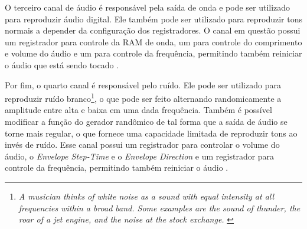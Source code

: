     O terceiro canal de áudio é responsável pela saída de onda e pode ser utilizado para reproduzir áudio digital. Ele também pode ser utilizado para reproduzir tons normais a depender da configuração dos registradores. O canal em questão possui um registrador para controle da RAM de onda, um para controle do comprimento e volume do áudio e um para controle da frequência, permitindo também reiniciar o áudio que está sendo tocado \cite{gbatek}.

    Por fim, o quarto canal é responsável pelo ruído. Ele pode ser utilizado para reproduzir ruído branco\footnote{\textit{A musician thinks of white noise as a sound with equal intensity at all frequencies within a broad band. Some examples are the sound of thunder, the roar of a jet engine, and the noise at the stock exchange.} \cite{kuo}}, o que pode ser feito alternando randomicamente a amplitude entre alta e baixa em uma dada frequência. Também é possível modificar a função do gerador randômico de tal forma que a saída de áudio se torne mais regular, o que fornece uma capacidade limitada de reproduzir tons ao invés de ruído. Esse canal possui um registrador para controlar o volume do áudio, o \textit{Envelope Step-Time} e o \textit{Envelope Direction} e um registrador para controle da frequência, permitindo também reiniciar o áudio \cite{gbatek}.
